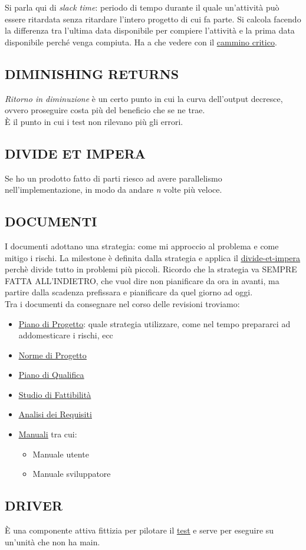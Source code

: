 		Si parla qui di \textit{slack time}: periodo di tempo durante il quale un'attività può essere ritardata senza ritardare l'intero progetto di cui fa parte. Si calcola facendo la differenza tra l'ultima data disponibile per compiere l'attività e la prima data disponibile perché venga compiuta. Ha a che vedere con il \underline{\hyperref[camminocritico]{cammino critico}}.

		\subsection{DIMINISHING RETURNS}		\label{diminishingreturn}	%
		\textit{Ritorno in diminuzione} è un certo punto in cui la curva dell'output decresce, ovvero proseguire costa più del beneficio che se ne trae. \\
		È il punto in cui i test non rilevano più gli errori.

		\subsection{DIVIDE ET IMPERA}	 \label{divideetimpera}
		Se ho un prodotto fatto di parti riesco ad avere parallelismo nell'implementazione, in modo da andare \textit{n} volte più veloce.

		\subsection{DOCUMENTI}		\label{documenti}
		I documenti adottano una strategia: come mi approccio al problema e come mitigo i rischi. La milestone è definita dalla strategia e applica il \underline{\hyperref[divideetimpera]{divide-et-impera}} perchè divide tutto in problemi più piccoli. Ricordo che la strategia va SEMPRE FATTA ALL'INDIETRO, che vuol dire non pianificare da ora in avanti, ma partire dalla scadenza prefissara e pianificare da quel giorno ad oggi. \\
		Tra i documenti da consegnare nel corso delle revisioni troviamo:
		\begin{itemize}
			\item \underline{\hyperref[piano]{Piano di Progetto}}: quale strategia utilizzare, come nel tempo prepararci ad addomesticare i rischi, ecc
			\item \underline{\hyperref[norme]{Norme di Progetto}}
			\item \underline{\hyperref[pianoqualifica]{Piano di Qualifica}}
			\item \underline{\hyperref[studiofattibilita]{Studio di Fattibilità}}
			\item \underline{\hyperref[analisideirequisiti]{Analisi dei Requisiti}}
			\item \underline{\hyperref[manuali]{Manuali}} tra cui:
			\begin{itemize}
				\item Manuale utente
				\item Manuale sviluppatore
			\end{itemize}
		\end{itemize}

		\subsection{DRIVER}		\label{driver}
		È una componente attiva fittizia per pilotare il \underline{\hyperref[test]{test}} e serve per eseguire su un'unità che non ha main.
